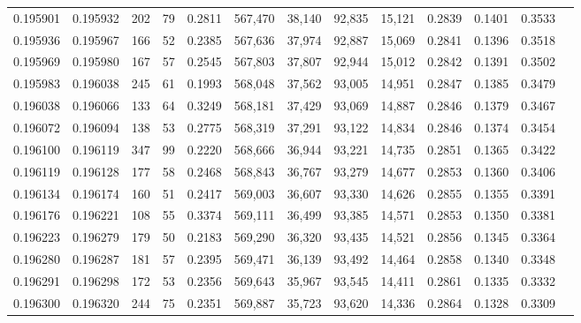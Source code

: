 \begin{tabular}{rrrrrrrrrrrrr}
0.195901 & 0.195932 &   202 &  79 &                                     0.2811 & 567,470 &  38,140 &  92,835 &  15,121 & 0.2839 & 0.1401 & 0.3533 \\
0.195936 & 0.195967 &   166 &  52 &                                     0.2385 & 567,636 &  37,974 &  92,887 &  15,069 & 0.2841 & 0.1396 & 0.3518 \\
0.195969 & 0.195980 &   167 &  57 &                                     0.2545 & 567,803 &  37,807 &  92,944 &  15,012 & 0.2842 & 0.1391 & 0.3502 \\
0.195983 & 0.196038 &   245 &  61 &                                     0.1993 & 568,048 &  37,562 &  93,005 &  14,951 & 0.2847 & 0.1385 & 0.3479 \\
0.196038 & 0.196066 &   133 &  64 &                                     0.3249 & 568,181 &  37,429 &  93,069 &  14,887 & 0.2846 & 0.1379 & 0.3467 \\
0.196072 & 0.196094 &   138 &  53 &                                     0.2775 & 568,319 &  37,291 &  93,122 &  14,834 & 0.2846 & 0.1374 & 0.3454 \\
0.196100 & 0.196119 &   347 &  99 &                                     0.2220 & 568,666 &  36,944 &  93,221 &  14,735 & 0.2851 & 0.1365 & 0.3422 \\
0.196119 & 0.196128 &   177 &  58 &                                     0.2468 & 568,843 &  36,767 &  93,279 &  14,677 & 0.2853 & 0.1360 & 0.3406 \\
0.196134 & 0.196174 &   160 &  51 &                                     0.2417 & 569,003 &  36,607 &  93,330 &  14,626 & 0.2855 & 0.1355 & 0.3391 \\
0.196176 & 0.196221 &   108 &  55 &                                     0.3374 & 569,111 &  36,499 &  93,385 &  14,571 & 0.2853 & 0.1350 & 0.3381 \\
0.196223 & 0.196279 &   179 &  50 &                                     0.2183 & 569,290 &  36,320 &  93,435 &  14,521 & 0.2856 & 0.1345 & 0.3364 \\
0.196280 & 0.196287 &   181 &  57 &                                     0.2395 & 569,471 &  36,139 &  93,492 &  14,464 & 0.2858 & 0.1340 & 0.3348 \\
0.196291 & 0.196298 &   172 &  53 &                                     0.2356 & 569,643 &  35,967 &  93,545 &  14,411 & 0.2861 & 0.1335 & 0.3332 \\
0.196300 & 0.196320 &   244 &  75 &                                     0.2351 & 569,887 &  35,723 &  93,620 &  14,336 & 0.2864 & 0.1328 & 0.3309 \\

\end{tabular}
